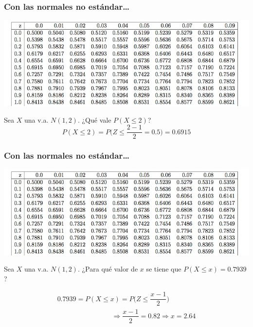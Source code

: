 \documentclass[handout]{beamer}\usepackage[]{graphicx}\usepackage[]{color}
\renewcommand{\leq}{\leqslant}
\theoremstyle{plain}
\theoremstyle{definition}
\begin{document}
\begin{frame}
\frametitle{Con las  normales no estándar\ldots}
\vspace*{-1cm}

\begin{center}
\hspace*{-0.4cm}\includegraphics[width=1.1\linewidth]{tabla.jpg}
\end{center}

Sea $X$ una v.a. $N(1,2)$. ¿Qué vale $P(X\leq 2)$?
$$
P(X\leq 2)=P\Big(Z\leq\frac{2-1}{2}=0.5\Big)=0.6915
$$

\end{frame}

\begin{frame}
\frametitle{Con  las normales no estándar\ldots}
\vspace*{-1cm}

\begin{center}
\hspace*{-0.4cm}\includegraphics[width=1.1\linewidth]{tabla.jpg}
\end{center}

Sea $X$ una v.a. $N(1,2)$. ¿Para qué   valor de $x$ se tiene que  $P(X\leq x)=0.7939$?

$$
\begin{array}{l}
0.7939=P(X\leq x)=P\Big(Z\leq\dfrac{x-1}{2}\Big)\\[1ex]\qquad\qquad\qquad\qquad \Rightarrow \dfrac{x-1}{2}=0.82
\Rightarrow x=2.64
\end{array}
$$

\end{frame}
\end{document}
